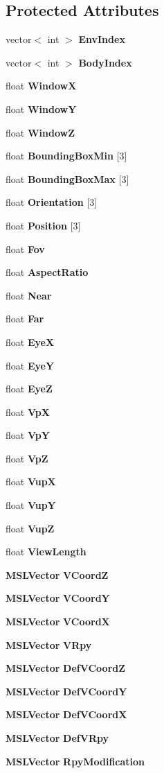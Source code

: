 \subsection*{Protected Attributes}
\begin{CompactItemize}
\item 
vector$<$ int $>$ {\bf Env\-Index}
\item 
vector$<$ int $>$ {\bf Body\-Index}
\item 
float {\bf Window\-X}
\item 
float {\bf Window\-Y}
\item 
float {\bf Window\-Z}
\item 
float {\bf Bounding\-Box\-Min} [3]
\item 
float {\bf Bounding\-Box\-Max} [3]
\item 
float {\bf Orientation} [3]
\item 
float {\bf Position} [3]
\item 
float {\bf Fov}
\item 
float {\bf Aspect\-Ratio}
\item 
float {\bf Near}
\item 
float {\bf Far}
\item 
float {\bf Eye\-X}
\item 
float {\bf Eye\-Y}
\item 
float {\bf Eye\-Z}
\item 
float {\bf Vp\-X}
\item 
float {\bf Vp\-Y}
\item 
float {\bf Vp\-Z}
\item 
float {\bf Vup\-X}
\item 
float {\bf Vup\-Y}
\item 
float {\bf Vup\-Z}
\item 
float {\bf View\-Length}
\item 
{\bf MSLVector} {\bf VCoord\-Z}
\item 
{\bf MSLVector} {\bf VCoord\-Y}
\item 
{\bf MSLVector} {\bf VCoord\-X}
\item 
{\bf MSLVector} {\bf VRpy}
\item 
{\bf MSLVector} {\bf Def\-VCoord\-Z}
\item 
{\bf MSLVector} {\bf Def\-VCoord\-Y}
\item 
{\bf MSLVector} {\bf Def\-VCoord\-X}
\item 
{\bf MSLVector} {\bf Def\-VRpy}
\item 
{\bf MSLVector} {\bf Rpy\-Modification}
\item 

\end{CompactItemize}
